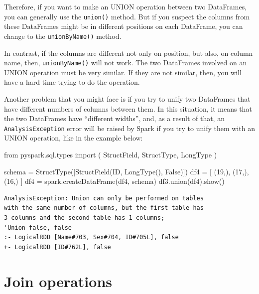 \documentclass[
  11pt,
  letterpaper,
  DIV=11,
  numbers=noendperiod]{scrreprt}
\newenvironment{Shaded}{\begin{snugshade}}{\end{snugshade}}
\newcommand{\DecValTok}[1]{\textcolor[rgb]{0.68,0.00,0.00}{#1}}
\newcommand{\ImportTok}[1]{\textcolor[rgb]{0.00,0.46,0.62}{#1}}
\newcommand{\NormalTok}[1]{\textcolor[rgb]{0.00,0.23,0.31}{#1}}
\newcommand{\OperatorTok}[1]{\textcolor[rgb]{0.37,0.37,0.37}{#1}}
\newcommand{\StringTok}[1]{\textcolor[rgb]{0.13,0.47,0.30}{#1}}
\newcommand{\VariableTok}[1]{\textcolor[rgb]{0.07,0.07,0.07}{#1}}
\begin{document}
Therefore, if you want to make an UNION operation between two
DataFrames, you can generally use the \texttt{union()} method. But if
you suspect the columns from these DataFrames might be in different
positions on each DataFrame, you can change to the
\texttt{unionByName()} method.

In contrast, if the columns are different not only on position, but
also, on column name, then, \texttt{unionByName()} will not work. The
two DataFrames involved on an UNION operation must be very similar. If
they are not similar, then, you will have a hard time trying to do the
operation.

Another problem that you might face is if you try to unify two
DataFrames that have different numbers of columns between them. In this
situation, it means that the two DataFrames have ``different widths'',
and, as a result of that, an \texttt{AnalysisException} error will be
raised by Spark if you try to unify them with an UNION operation, like
in the example below:

\begin{Shaded}
\begin{Highlighting}[]
\ImportTok{from}\NormalTok{ pyspark.sql.types }\ImportTok{import}\NormalTok{ (}
\NormalTok{    StructField,}
\NormalTok{    StructType,}
\NormalTok{    LongType}
\NormalTok{)}

\NormalTok{schema }\OperatorTok{=}\NormalTok{ StructType([StructField(}\StringTok{\textquotesingle{}ID\textquotesingle{}}\NormalTok{, LongType(), }\VariableTok{False}\NormalTok{)])}
\NormalTok{df4 }\OperatorTok{=}\NormalTok{ [}
\NormalTok{    (}\DecValTok{19}\NormalTok{,), (}\DecValTok{17}\NormalTok{,), (}\DecValTok{16}\NormalTok{,)}
\NormalTok{]}
\NormalTok{df4 }\OperatorTok{=}\NormalTok{ spark.createDataFrame(df4, schema)}
\NormalTok{df3.union(df4).show()}
\end{Highlighting}
\end{Shaded}

\begin{verbatim}
AnalysisException: Union can only be performed on tables
with the same number of columns, but the first table has
3 columns and the second table has 1 columns;
'Union false, false
:- LogicalRDD [Name#703, Sex#704, ID#705L], false
+- LogicalRDD [ID#762L], false
\end{verbatim}

\hypertarget{join-operations}{%
\section{Join operations}\label{join-operations}}
\end{document}

